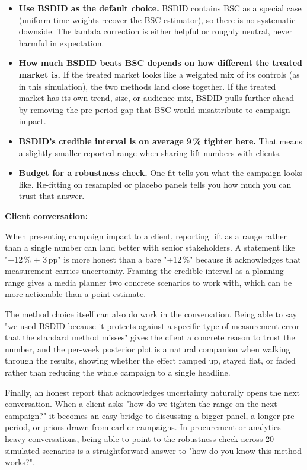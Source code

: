 \documentclass[a4paper,11pt]{article}
\begin{document}
\begin{itemize}
  \item \textbf{Use BSDID as the default choice.} BSDID contains BSC
        as a special case (uniform time weights recover the BSC
        estimator), so there is no systematic downside. The lambda
        correction is either helpful or roughly neutral, never
        harmful in expectation.
  \item \textbf{How much BSDID beats BSC depends on how different
        the treated market is.} If the treated market looks like a
        weighted mix of its controls (as in this simulation), the
        two methods land close together. If the treated market has
        its own trend, size, or audience mix, BSDID pulls further
        ahead by removing the pre-period gap that BSC would
        misattribute to campaign impact.
  \item \textbf{BSDID's credible interval is on average 9\,\%
        tighter here.} That means a slightly smaller reported range
        when sharing lift numbers with clients.
  \item \textbf{Budget for a robustness check.} One fit tells you
        what the campaign looks like. Re-fitting on resampled or
        placebo panels tells you how much you can trust that answer.
\end{itemize}

\textbf{Client conversation:}

When presenting campaign impact to a client, reporting lift as a
range rather than a single number can land better with senior
stakeholders. A statement like "+12\,\% $\pm$ 3\,pp" is more honest
than a bare "+12\,\%" because it acknowledges that measurement
carries uncertainty. Framing the credible interval as a planning
range gives a media planner two concrete scenarios to work with,
which can be more actionable than a point estimate.

The method choice itself can also do work in the conversation.
Being able to say "we used BSDID because it protects against a
specific type of measurement error that the standard method misses"
gives the client a concrete reason to trust the number, and the
per-week posterior plot is a natural companion when walking through
the results, showing whether the effect ramped up, stayed flat, or
faded rather than reducing the whole campaign to a single headline.

Finally, an honest report that acknowledges uncertainty naturally
opens the next conversation. When a client asks "how do we tighten
the range on the next campaign?" it becomes an easy bridge to
discussing a bigger panel, a longer pre-period, or priors drawn
from earlier campaigns. In procurement or analytics-heavy
conversations, being able to point to the robustness check across
20 simulated scenarios is a straightforward answer to "how do you
know this method works?".
\end{document}
